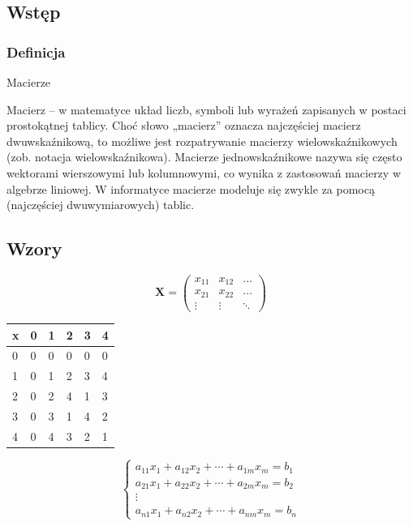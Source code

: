 \documentclass[12pt, a4paper]{article}
\begin{document}
\subsection{Wstęp}
\label{sec:Wstep}

\subsubsection{Definicja}
\label{sec:Definicja}


\begin{center}\large {Macierze}
\end{center}
Macierz – w matematyce układ liczb, symboli lub wyrażeń zapisanych w postaci prostokątnej tablicy. Choć słowo „macierz” oznacza najczęściej macierz dwuwskaźnikową, to możliwe jest rozpatrywanie macierzy wielowskaźnikowych (zob. notacja wielowskaźnikowa). Macierze jednowskaźnikowe nazywa się często wektorami wierszowymi lub kolumnowymi, co wynika z zastosowań macierzy w algebrze liniowej. W informatyce macierze modeluje się zwykle za pomocą (najczęściej dwuwymiarowych) tablic. 
\cite{macierze}

\subsection{Wzory}
\label{sec:Wzory}

\begin{equation}
\label{eq:nr3}
\mathbf{X} =
\left( \begin{array}{ccc}
x_{11} & x_{12} & \ldots \\
x_{21} & x_{22} & \ldots \\
\vdots & \vdots & \ddots
\end{array} \right)
\end{equation}

\vspace{2cm}
\begin{table}[|h|]
\begin{tabular}{|l|l|l|l|l|l|}
  \hline 
  x & 0 & 1 & 2 & 3 & 4\\
  \hline
  0 & 0 & 0 & 0 & 0 & 0\\
  \hline
  1 & 0 & 1 & 2 & 3 & 4\\
  \hline
  2 & 0 & 2 & 4 & 1 & 3\\
  \hline
  3 & 0 & 3 & 1 & 4 & 2\\
  \hline
  4 & 0 & 4 & 3 & 2 & 1\\
  \hline
\end{tabular}
\end{table}

\vspace{2cm}
\begin{equation}
\label{eq:nr4}
\begin{cases}
a_{11}x_1 + a_{12}x_2 + \cdots + a_{1m}x_m = b_1 \\ 
a_{21}x_1 + a_{22}x_2 + \cdots + a_{2m}x_m = b_2 \\
\vdots\\
a_{n1}x_1 + a_{n2} x_2 + \cdots + a_{nm}x_m = b_n 
\end{cases} 
\end{equation}

\newpage



\end{document}
